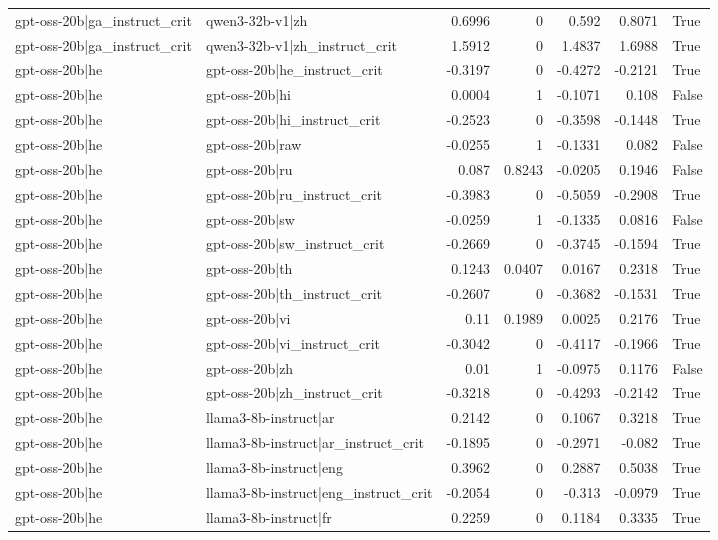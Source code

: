 \begin{table}
\begin{tabular}{l l r r r r l}
gpt-oss-20b|ga_instruct_crit & qwen3-32b-v1|zh & 0.6996 & 0 & 0.592 & 0.8071 & True \\
gpt-oss-20b|ga_instruct_crit & qwen3-32b-v1|zh_instruct_crit & 1.5912 & 0 & 1.4837 & 1.6988 & True \\
gpt-oss-20b|he & gpt-oss-20b|he_instruct_crit & -0.3197 & 0 & -0.4272 & -0.2121 & True \\
gpt-oss-20b|he & gpt-oss-20b|hi & 0.0004 & 1 & -0.1071 & 0.108 & False \\
gpt-oss-20b|he & gpt-oss-20b|hi_instruct_crit & -0.2523 & 0 & -0.3598 & -0.1448 & True \\
gpt-oss-20b|he & gpt-oss-20b|raw & -0.0255 & 1 & -0.1331 & 0.082 & False \\
gpt-oss-20b|he & gpt-oss-20b|ru & 0.087 & 0.8243 & -0.0205 & 0.1946 & False \\
gpt-oss-20b|he & gpt-oss-20b|ru_instruct_crit & -0.3983 & 0 & -0.5059 & -0.2908 & True \\
gpt-oss-20b|he & gpt-oss-20b|sw & -0.0259 & 1 & -0.1335 & 0.0816 & False \\
gpt-oss-20b|he & gpt-oss-20b|sw_instruct_crit & -0.2669 & 0 & -0.3745 & -0.1594 & True \\
gpt-oss-20b|he & gpt-oss-20b|th & 0.1243 & 0.0407 & 0.0167 & 0.2318 & True \\
gpt-oss-20b|he & gpt-oss-20b|th_instruct_crit & -0.2607 & 0 & -0.3682 & -0.1531 & True \\
gpt-oss-20b|he & gpt-oss-20b|vi & 0.11 & 0.1989 & 0.0025 & 0.2176 & True \\
gpt-oss-20b|he & gpt-oss-20b|vi_instruct_crit & -0.3042 & 0 & -0.4117 & -0.1966 & True \\
gpt-oss-20b|he & gpt-oss-20b|zh & 0.01 & 1 & -0.0975 & 0.1176 & False \\
gpt-oss-20b|he & gpt-oss-20b|zh_instruct_crit & -0.3218 & 0 & -0.4293 & -0.2142 & True \\
gpt-oss-20b|he & llama3-8b-instruct|ar & 0.2142 & 0 & 0.1067 & 0.3218 & True \\
gpt-oss-20b|he & llama3-8b-instruct|ar_instruct_crit & -0.1895 & 0 & -0.2971 & -0.082 & True \\
gpt-oss-20b|he & llama3-8b-instruct|eng & 0.3962 & 0 & 0.2887 & 0.5038 & True \\
gpt-oss-20b|he & llama3-8b-instruct|eng_instruct_crit & -0.2054 & 0 & -0.313 & -0.0979 & True \\
gpt-oss-20b|he & llama3-8b-instruct|fr & 0.2259 & 0 & 0.1184 & 0.3335 & True \\

\end{tabular}
\end{table}
